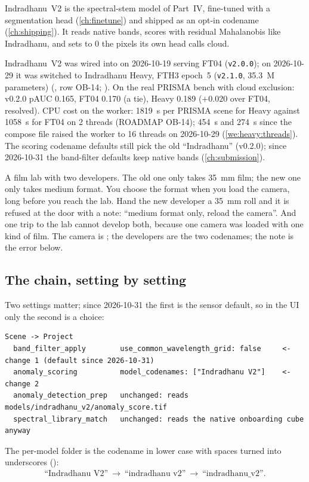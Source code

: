 Indradhanu~V2 is the spectral-stem model of Part~IV, fine-tuned with a segmentation head (\cref{ch:finetune})
and shipped as an opt-in codename (\cref{ch:shipping}). It reads native bands, scores with residual
Mahalanobis like Indradhanu, and sets to 0 the pixels its own head calls cloud.

\begin{drift}
Indradhanu~V2 was wired into  on 2026-10-19 serving FT04 (\texttt{v2.0.0}); on
2026-10-29 it was switched to Indradhanu Heavy, FTH3 epoch~5 (\texttt{v2.1.0}, 35.3~M parameters)
(, row OB-14; ). On the real PRISMA bench with cloud
exclusion: v0.2.0 pAUC 0.165, FT04 0.170 (a tie), Heavy 0.189 ($+0.020$ over FT04, resolved). CPU cost on the
worker: 1819~s per PRISMA scene for Heavy against 1058~s for FT04 on 2 threads (ROADMAP OB-14); 454~s and 274~s
since the compose file raised the worker to 16 threads on 2026-10-29 (\cref{we:heavy:threads}). The scoring codename
defaults still pick the old ``Indradhanu'' (v0.2.0); since 2026-10-31 the band-filter defaults keep native bands
(\cref{ch:submission}).
\end{drift}

\begin{analogy}
A film lab with two developers. The old one only takes 35~mm film; the new one only takes medium format. You
choose the format when you load the camera, long before you reach the lab. Hand the new developer a 35~mm
roll and it is refused at the door with a note: ``medium format only, reload the camera''. And one trip to
the lab cannot develop both, because one camera was loaded with one kind of film. The camera is
; the developers are the two codenames; the note is the error below.
\end{analogy}

\subsection{The chain, setting by setting}

Two settings matter; since 2026-10-31 the first is the sensor default, so in the UI only the second is a choice:
\begin{lstlisting}[language={}]
Scene -> Project
  band_filter_apply        use_common_wavelength_grid: false     <- change 1 (default since 2026-10-31)
  anomaly_scoring          model_codenames: ["Indradhanu V2"]    <- change 2
  anomaly_detection_prep   unchanged: reads models/indradhanu_v2/anomaly_score.tif
  spectral_library_match   unchanged: reads the native onboarding cube anyway
\end{lstlisting}
The per-model folder is the codename in lower case with spaces turned into underscores ():
\begin{align*}
\text{``Indradhanu V2''}\ \to\ \text{``indradhanu v2''}\ \to\ \text{``indradhanu\_v2''}.
\end{align*}

